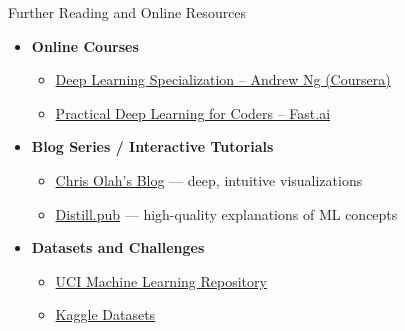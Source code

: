\documentclass[aspectratio=169]{beamer}
\begin{document}
\begin{frame}{Further Reading and Online Resources}

\begin{itemize}
    \item \textbf{Online Courses}
    \begin{itemize}
    	\normalsize
        \item \href{https://www.coursera.org/specializations/deep-learning}{Deep Learning Specialization – Andrew Ng (Coursera)}
        \item \href{https://course.fast.ai}{Practical Deep Learning for Coders – Fast.ai}
    \end{itemize}

    \item \textbf{Blog Series / Interactive Tutorials}
    \begin{itemize}
    	\normalsize
        \item \href{https://colah.github.io}{Chris Olah’s Blog} — deep, intuitive visualizations
        \item \href{https://distill.pub}{Distill.pub} — high-quality explanations of ML concepts
    \end{itemize}

    \item \textbf{Datasets and Challenges}
    \begin{itemize}
    	\normalsize
        \item \href{https://archive.ics.uci.edu/ml/index.php}{UCI Machine Learning Repository}
        \item \href{https://www.kaggle.com/datasets}{Kaggle Datasets}
    \end{itemize}
\end{itemize}

\end{frame}
%
\end{document}
